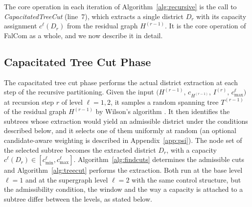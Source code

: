 \documentclass[preprint,12pt,authoryear]{elsarticle}
\theoremstyle{definition}
\begin{document}
\medskip
\medskip

The core operation in each iteration of Algorithm~\ref{alg:recursive} is the call to \textit{CapacitatedTreeCut} (line~7), which extracts a single district $D_r$ with its capacity assignment $c^\ell(D_r)$ from the residual graph $H^{(r-1)}$. It is the core operation of FalCom as a whole, and we now describe it in detail.


\subsection{Capacitated Tree Cut Phase}
\label{sec:capacitated}

The capacitated tree cut phase performs the actual district extraction at
each step of the recursive partitioning. Given the input $(H^{(r-1)},\, c_{H^{(r-1)}},\, I^{(r)},\, c_{\max}^{\ell}\bigr)$ at recursion step $r$ of level $\ell=1,2$, it samples a random spanning tree $T^{(r-1)}$ of the residual graph $H^{(r-1)}$ by Wilson's algorithm \cite{wilson1996generating}. It then identifies the subtrees whose extraction would yield an admissible district under the conditions described below, and it selects one of them uniformly at random (an optional candidate-aware weighting is described in Appendix~\ref{app:psi}). The node set of the selected subtree becomes the extracted district $D_r$, with a capacity $c^{\ell}(D_r) \in [c^{\ell}_{\min}, c^{\ell}_{\max}]$. Algorithm~\ref{alg:findcuts} determines the admissible cuts and Algorithm~\ref{alg:treecut} performs the extraction. Both run at the base level $\ell=1$ and at the supergraph level $\ell=2$ with the same control structure, but the admissibility condition, the window and the way a capacity is attached to a subtree differ between the levels, as stated below.
\end{document}
